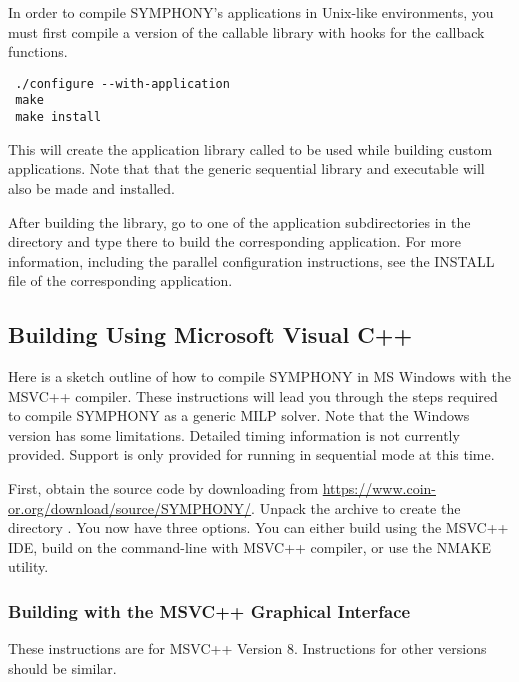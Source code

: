 In order to compile SYMPHONY's applications in Unix-like environments, you
must first compile a version of the callable library with hooks for the
callback functions. {\color{Brown}
\begin{verbatim}
 ./configure --with-application
 make 
 make install
\end{verbatim}
} This will create the application library called  to be used
while building custom applications. Note that that the generic sequential
library and executable will also be made and installed.

After building the library, go to one of the application subdirectories in the
 directory and type  there to build
the corresponding application. For more information, including the parallel
configuration instructions, see the INSTALL file of the corresponding
application.

\subsection{Building Using Microsoft Visual C++}
\label{getting_started_windows}

Here is a sketch outline of how to compile SYMPHONY in MS Windows with the
MSVC++ compiler. These instructions will lead you through the steps required
to compile SYMPHONY as a generic MILP solver. Note that the Windows version
has some limitations. Detailed timing information is not currently provided.
Support is only provided for running in sequential mode at this time.

First, obtain the source code by downloading from
\url{https://www.coin-or.org/download/source/SYMPHONY/}. Unpack the archive to
create the directory . You now have three options. You
can either build using the MSVC++ IDE, build on the command-line with MSVC++
compiler, or use the NMAKE utility.

\subsubsection{Building with the MSVC++ Graphical Interface}
\label{using_msvc}

These instructions are for MSVC++ Version 8. Instructions for other versions
should be similar.

